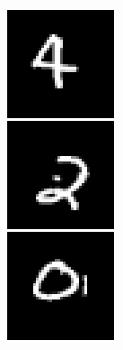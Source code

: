 \begin{figure}
    \centering
    \begin{subfigure}[c]{.09\linewidth}
        \includegraphics[width=\linewidth]{figures/SCA/mnist/inputs}

\end{subfigure}
\end{figure}
